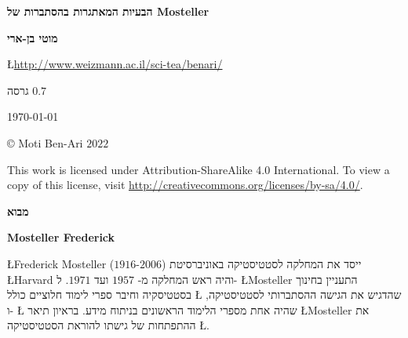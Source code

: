 


\thispagestyle{empty}

\begin{center}
\textbf{\LARGE הבעיות המאתגרות בהסתברות של Mosteller}

\bigskip
\bigskip
\bigskip

\textbf{\Large מוטי בן-ארי}

\bigskip

\L{\url{http://www.weizmann.ac.il/sci-tea/benari/}}

\bigskip
\bigskip
\bigskip

 גרסה
$0.7$

\bigskip

\today

\end{center}

\vfill

\begin{center}
\copyright{} Moti Ben-Ari $2022$
 \end{center}
 
\begin{small}
This work is licensed under Attribution-ShareAlike 4.0 International. To view a copy of this license, visit \url{http://creativecommons.org/licenses/by-sa/4.0/}.
\end{small}
\newpage


\tableofcontents

\newpage

\begin{center}
\textbf{\Large מבוא}
\end{center}


\bigskip

\textbf{Mosteller Frederick}

\L{Frederick Mosteller}
($1916$-$2006$)
ייסד את המחלקה לסטטיסטיקה באוניברסיטת 
\L{Harvard}
והיה ראש המחלקה מ-%
$1957$
ועד
$1971$.
ל-%
\L{Mosteller}
התעניין בחינוך בסטטיסקיה וחיבר ספרי לימוד חלוציים כולל 
\L{\cite{pwsa}}
שהדגיש את הגישה ההסתברותי לסטטיסטיקה, ו-%
\L{\cite{bsda}}
שהיה אחת מספרי הלימוד הראשונים בניתוח מידע. בראיון תיאר 
\L{Mosteller}
את ההתפתחות של גישתו להוראת הסטטיסטיקה
\L{\cite{gse}}.

